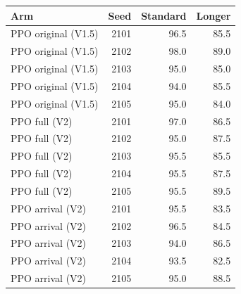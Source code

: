 \par\noindent\begin{minipage}{\columnwidth}
\label{tab:seeds}\centering\small
\begin{tabular}{lrrr}\toprule
Arm & Seed & Standard & Longer\\\midrule
PPO original (V1.5) & 2101 & 96.5 & 85.5\\
PPO original (V1.5) & 2102 & 98.0 & 89.0\\
PPO original (V1.5) & 2103 & 95.0 & 85.0\\
PPO original (V1.5) & 2104 & 94.0 & 85.5\\
PPO original (V1.5) & 2105 & 95.0 & 84.0\\
PPO full (V2) & 2101 & 97.0 & 86.5\\
PPO full (V2) & 2102 & 95.0 & 87.5\\
PPO full (V2) & 2103 & 95.5 & 85.5\\
PPO full (V2) & 2104 & 95.5 & 87.5\\
PPO full (V2) & 2105 & 95.5 & 89.5\\
PPO arrival (V2) & 2101 & 95.5 & 83.5\\
PPO arrival (V2) & 2102 & 96.5 & 84.5\\
PPO arrival (V2) & 2103 & 94.0 & 86.5\\
PPO arrival (V2) & 2104 & 93.5 & 82.5\\
PPO arrival (V2) & 2105 & 95.0 & 88.5\\
\bottomrule\end{tabular}
\end{minipage}\par
